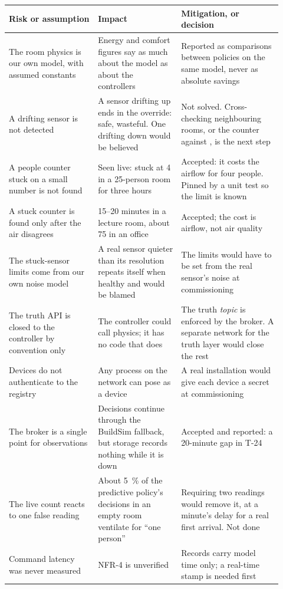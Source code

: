 \begin{longtable}[]{@{}L{0.30\linewidth}L{0.28\linewidth}L{0.34\linewidth}@{}}
\toprule
\textbf{Risk or assumption} & \textbf{Impact} & \textbf{Mitigation, or decision} \\
\midrule
\endhead
The room physics is our own model, with assumed constants & Energy and comfort figures say as much about the model as about the controllers & Reported as comparisons between policies on the same model, never as absolute savings \\
A drifting sensor is not detected & A \COtwo{} sensor drifting up ends in the override: safe, wasteful. One drifting down would be believed & Not solved. Cross-checking neighbouring rooms, or the counter against \COtwo{}, is the next step \\
A people counter stuck on a small number is not found & Seen live: stuck at 4 in a 25-person room for three hours & Accepted: it costs the airflow for four people. Pinned by a unit test so the limit is known \\
A stuck counter is found only after the air disagrees & 15--20 minutes in a lecture room, about 75 in an office & Accepted; the cost is airflow, not air quality \\
The stuck-sensor limits come from our own noise model & A real sensor quieter than its resolution repeats itself when healthy and would be blamed & The limits would have to be set from the real sensor's noise at commissioning \\
The truth API is closed to the controller by convention only & The controller could call physics; it has no code that does & The truth \emph{topic} is enforced by the broker. A separate network for the truth layer would close the rest \\
Devices do not authenticate to the registry & Any process on the network can pose as a device & A real installation would give each device a secret at commissioning \\
The broker is a single point for observations & Decisions continue through the BuildSim fallback, but storage records nothing while it is down & Accepted and reported: a 20-minute gap in T-24 \\
The live count reacts to one false reading & About 5~\% of the predictive policy's decisions in an empty room ventilate for ``one person'' & Requiring two readings would remove it, at a minute's delay for a real first arrival. Not done \\
Command latency was never measured & NFR-4 is unverified & Records carry model time only; a real-time stamp is needed first \\

\end{longtable}
